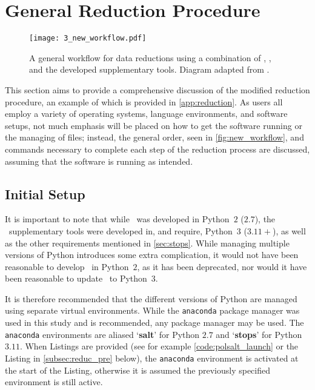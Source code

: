\pagebreak

\section{General Reduction Procedure}\label{sec:red_proc}

\begin{figure}[t]
    \centering
    \texttt{[image: 3\_new\_workflow.pdf]}
    \caption{A general workflow for data reductions using a combination of \polsalt, \iraf, and the developed supplementary tools. Diagram adapted from \cite{cooper_HEASA2022}.}
    \label{fig:new_workflow}
\end{figure}

This section aims to provide a comprehensive discussion of the modified reduction procedure, an example of which is provided in \autoref{app:reduction}. As users all employ a variety of operating systems, language environments, and software setups, not much emphasis will be placed on how to get the software running or the managing of files; instead, the general order, seen in \autoref{fig:new_workflow}, and commands necessary to complete each step of the reduction process are discussed, assuming that the software is running as intended.

\subsection{Initial Setup} \label{subsec:reduc_setup}

It is important to note that while \polsalt\ was developed in Python~$2$ ($2.7$), the \stops\ supplementary tools were developed in, and require, Python~$3$ ($3.11+$), as well as the other requirements mentioned in \autoref{sec:stops}. While managing multiple versions of Python introduces some extra complication, it would not have been reasonable to develop \stops\ in Python~$2$, as it has been deprecated, nor would it have been reasonable to update \polsalt\ to Python~$3$.

It is therefore recommended that the different versions of Python are managed using separate virtual environments. While the \texttt{anaconda} package manager was used in this study and is recommended, any package manager may be used. The \texttt{anaconda} environments are aliased `\textbf{salt}' for Python $2.7$ and `\textbf{stops}' for Python $3.11$. When Listings are provided (see for example \autoref{code:polsalt_launch} or the Listing in \autoref{subsec:reduc_pre} below), the \texttt{anaconda} environment is activated at the start of the Listing, otherwise it is assumed the previously specified environment is still active.

